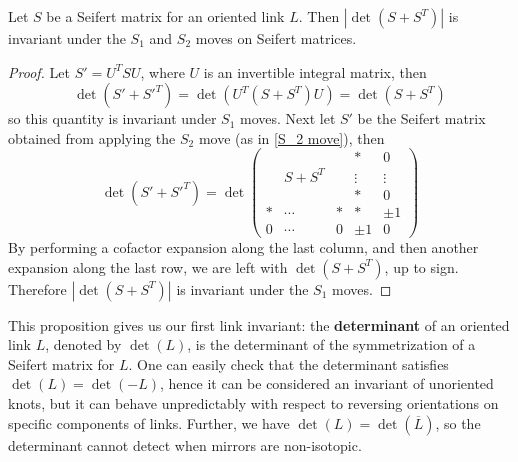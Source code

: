 \begin{prop}
Let $S$ be a Seifert matrix for an oriented link $L$. Then $|\det(S+S^T)|$ is invariant under the $S_1$ and $S_2$ moves on Seifert matrices.
\end{prop}
\begin{proof}
Let $S' = U^T S U$, where $U$ is an invertible integral matrix, then
\[ \det(S'+S'^T) = \det(U^T(S+S^T)U) = \det(S+S^T) \]
so this quantity is invariant under $S_1$ moves. Next let $S'$ be the Seifert matrix obtained from applying the $S_2$ move (as in \cref{S_2 move}), then
\[ \det(S'+S'^T) = \det \begin{pmatrix} & & & * & 0 \\ & S+S^T & & \vdots & \vdots \\ & & & * & 0 \\ * & \cdots & * & * & \pm 1 \\ 0 & \cdots & 0 & \pm 1 & 0 \end{pmatrix} \]
By performing a cofactor expansion along the last column, and then another expansion along the last row, we are left with $\det(S+S^T)$, up to sign. Therefore $|\det(S+S^T)|$ is invariant under the $S_1$ moves.
\end{proof}

This proposition gives us our first link invariant: the \textbf{determinant} of an oriented link $L$, denoted by $\det(L)$, is the determinant of the symmetrization of a Seifert matrix for $L$. One can easily check that the determinant satisfies $\det(L)=\det(-L)$, hence it can be considered an invariant of unoriented knots, but it can behave unpredictably with respect to reversing orientations on specific components of links. Further, we have $\det(L)=\det(\overline L)$, so the determinant cannot detect when mirrors are non-isotopic.

